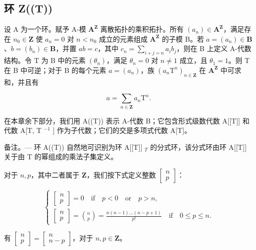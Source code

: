 \subsection{环 Z((T))}

设 A 为一个环。赋予 A-模 \(\mathbf{A}^{\mathbf{Z}}\) 离散拓扑的乘积拓扑。所有 \((a_{n})\in\mathbf{A}^{\mathbf{Z}}\)，满足存在 \(n_{0}\in\mathbf{Z}\) 使 \(a_{n}=0\) 对 \(n<n_{0}\) 成立的元素组成 \(\mathbf{A}^{\mathbf{Z}}\) 的子模 B。若 \(a=(a_{n})\in\mathbf{B}\)、\(b=(b_{n})\in\mathbf{B}\)，并置 \(ab=c\)，其中 \(c_{n}=\sum_{i+j=n}a_{i}b_{j}\)，则在 B 上定义 A-代数结构。令 T 为 B 中的元素 \((\theta_{n})\)，满足 \(\theta_{n}=0\) 对 \(n\neq1\) 成立，且 \(\theta_{1}=1\)。则 T 在 B 中可逆；对于 B 的每个元素 \(a=(a_{n})\)，族 \((a_{n}\mathrm{T}^{n})_{n\in\mathbf{Z}}\) 在 \(\mathbf{A}^{\mathbf{Z}}\) 中可求和，并且有

\[
a = \sum_ {n \in \mathbf {Z}} a _ {n} \mathrm{T} ^ {n}.
\]

在本章余下部分，我们用 A((T)) 表示 A-代数 B；它包含形式级数代数 A{[}{[}T{]}{]} 和代数 A{[}T, T \(^{-1}\) {]} 作为子代数；它们的交是多项式代数 A{[}T{]}。

备注。--- 环 A((T)) 自然地可识别为环 A{[}{[}T{]}{]} \(_{T}\) 的分式环，该分式环由环 A{[}{[}T{]}{]} 关于由 T 的幂组成的乘法子集定义。

对于 \(n, p\)，其中二者属于 \(\mathbf{Z}\)，我们按下式定义整数 \(\begin{bmatrix} n \\ p \end{bmatrix}\)：

\[
\left\{ \begin{array}{l} {\left[ \begin{array}{l} n \\ p \end{array} \right] = 0 \quad \text {if} \quad p <   0 \quad \text {or} \quad p > n,} \\ {\left[ \begin{array}{l} n \\ p \end{array} \right] = \binom {n} {p} = \frac {n (n - 1) \dots (n - p + 1)}{p !} \quad \text {if} \quad 0 \leqslant p \leqslant n.} \end{array} \right.\tag{1}
\]

有 \(\begin{bmatrix} n \\ p \end{bmatrix} = \begin{bmatrix} n \\ n - p \end{bmatrix}\)，对于 \(n, p \in \mathbf{Z}\)。

